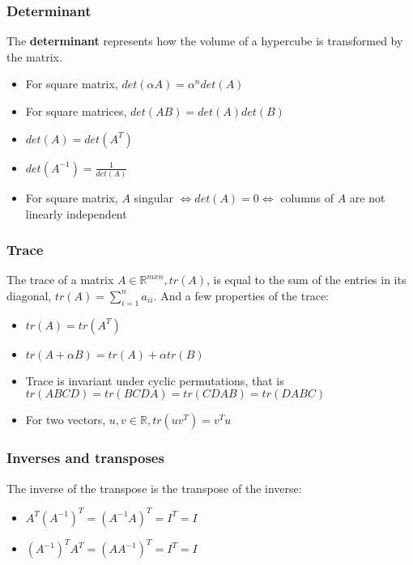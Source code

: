 \documentclass{article}
\begin{document}
\subsubsection{Determinant}
The \textbf{determinant} represents how the volume of a hypercube is transformed by the matrix.
\begin{itemize}
    \item For square matrix, $det(\alpha A) = \alpha^ndet(A)$
    \item For square matrices, $det(AB) = det(A)det(B)$
    \item $det(A) = det(A^T)$
    \item $det(A^{-1}) = \frac{1}{det(A)}$
    \item For square matrix, $A$ singular $\Leftrightarrow det(A) = 0 \Leftrightarrow$ columns of $A$ are not linearly independent
\end{itemize}

\subsubsection{Trace}
The trace of a matrix $A \in \mathbb{R}^{mxn}, tr(A)$, is equal to the sum of the entries in its diagonal, $tr(A) = \sum_{i = 1}^n a_{ii}$. And a few properties of the trace:
\begin{itemize}
    \item $tr(A) = tr(A^T)$
    \item $tr(A + \alpha B) = tr(A) + \alpha tr(B)$
    \item Trace is invariant under cyclic permutations, that is $tr(ABCD) = tr(BCDA) = tr(CDAB) = tr(DABC)$
    \item For two vectors, $u, v \in \mathbb{R}, tr(uv^T) = v^Tu$
\end{itemize}

\subsubsection{Inverses and transposes}
The inverse of the transpose is the transpose of the inverse:
\begin{itemize}
    \item $A^T(A^{-1})^T = (A^{-1}A)^T = I^T = I$
    \item $(A^{-1})^TA^T = (AA^{-1})^T = I^T = I$
\end{itemize}
\end{document}
